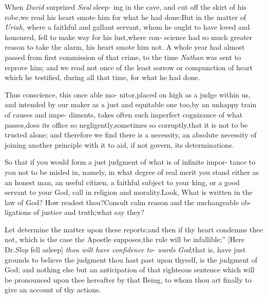 \documentclass{article}
\begin{document}
\lqq When \textit{David} surprized \textit{Saul} sleep-\break
\lqq ing in the cave, and cut off the skirt\break
\lqq of his robe,\tsk we read his heart smote\break
\lqq him for what he had done:\tsk But in\break
\lqq the matter of \textit{Uriah}, where a faithful\break
\lqq and gallant servant, whom he ought\break
\lqq to have loved and honoured, fell to\break
\lqq make way for his lust,\tsk where con-
\lqq science had so much greater reason to\break
\lqq take the alarm, his heart smote him\break
\lqq not.  A whole year had almost passed\break
\lqq from first commission of that crime,\break
\lqq to the time \textit{Nathan} was sent to reprove\break
\lqq him; and we read not once of the least\break
\lqq sorrow or compunction of heart which\break
\lqq he testified, during all that time, for\break
\lqq what he had done.

\lqq Thus conscience, this once able mo-\break
\lqq nitor,\tsh placed on high as a judge\break
\lqq within us, and intended by our maker\break
\lqq as a just and equitable one too,\tsk by\break
\lqq an unhappy train of causes and impe-\break
\lqq diments, takes often such imperfect\break
\lqq cognizance of what passes,\tsh does its\break
\lqq office so negligently,\tsh sometimes so\break
\lqq corruptly,\tsk that it is not to be trusted\break
\lqq alone; and therefore we find there is\break
\lqq a necessity, an absolute necessity of
\lqq joining another principle with it to aid,\break
\lqq if not govern, its determinations.

\lqq So that if you would form a just\break
\lqq judgment of what is of infinite impor-\break
\lqq tance to you not to be misled in,\tsh\break
\lqq namely, in what degree of real merit\break
\lqq you stand either as an honest man, an\break
\lqq useful citizen, a faithful subject to your\break
\lqq king, or a good servant to your God,\tsk\break
\lqq call in religion and morality.\tsk Look,\break
\lqq \tsk What is written in the law of God?\break
\lqq \tsh How readest thou?\tsh Consult\break
\lqq calm reason and the unchangeable ob-\break
\lqq ligations of justice and truth;\tsk what\break
\lqq say they?

\lqq Let  determine the\break
\lqq matter upon these reports;\tsk and then\break
\lqq if thy heart condemns thee not, which\break
\lqq is the case the Apostle supposes,\tsh the
\lqq rule will be infallible;” [Here Dr.\@ \textit{Slop}\break
fell asleep] \lqq \textit{thou wilt have confidence to-}\break
\lqq \textit{wards God};\tsk that is, have just grounds\break
\lqq to believe the judgment thou hast past\break
\lqq upon thyself, is the judgment of God;\break
\lqq and nothing else but an anticipation\break
\lqq of that righteous sentence which will\break
\lqq be pronounced upon thee hereafter by\break
\lqq that Being, to whom thou art finally\break
\lqq to give an account of thy actions.
\end{document}

